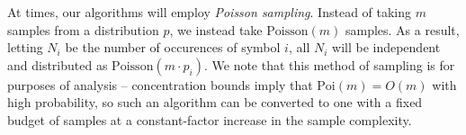 At times, our algorithms will employ \emph{Poisson sampling}.
Instead of taking $m$ samples from a distribution $p$, we instead take $\mathrm{Poisson}(m)$ samples.
As a result, letting $N_i$ be the number of occurences of symbol $i$, all $N_i$ will be independent and distributed as $\mathrm{Poisson}(m \cdot p_i)$.
We note that this method of sampling is for purposes of analysis -- concentration bounds imply that $\mathrm{Poi}(m) = O(m)$ with high probability, so such an algorithm can be converted to one with a fixed budget of samples at a constant-factor increase in the sample complexity.
